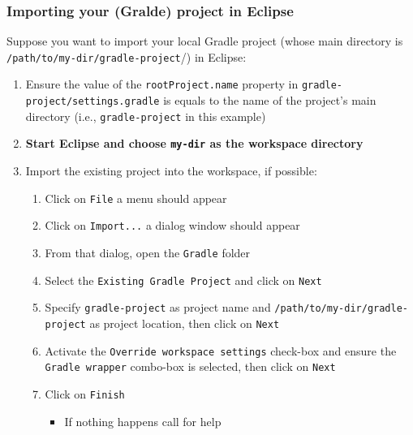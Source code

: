 \documentclass[handout]{beamer}\mode<presentation>{\usetheme{AMSCesenaPurpleAndGold}}
\begin{document}
\begin{frame}[allowframebreaks]
\frametitle{Importing your (Gralde) project in Eclipse}
\label{import-gradle-project}

    Suppose you want to import your local Gradle project (whose main directory is \texttt{/path/to/\alert{my-dir}/gradle-project}/) in Eclipse:
    
    \begin{enumerate}
        \item Ensure the value of the  \texttt{rootProject.name} property in \texttt{gradle-project/\alert{settings.gradle}} is equals to the name of the project's main directory (i.e., \texttt{gradle-project} in this example)
        
        \item \textbf{Start Eclipse and choose \texttt{\alert{my-dir}} as the workspace directory}
        
        \item Import the existing project into the workspace, if possible:
        \begin{enumerate}
            \item Click on \texttt{File} a menu should appear
            \item Click on \texttt{Import...} a dialog window should appear
            \item From that dialog, open the \texttt{Gradle} folder
            \item Select the \texttt{Existing Gradle Project} and click on \texttt{Next}
            \item Specify \texttt{gradle-project} as project name and \texttt{/path/to/my-dir/gradle-project} as project location, then click on \texttt{Next}
            \item Activate the \texttt{Override workspace settings} check-box and ensure the \texttt{Gradle wrapper} combo-box is selected, then click on \texttt{Next}
            \item Click on \texttt{Finish}
            \begin{itemize}
                \item If nothing happens call for help
            \end{itemize}
        \end{enumerate}
        
    \end{enumerate}
    
\end{frame}
\end{document}
